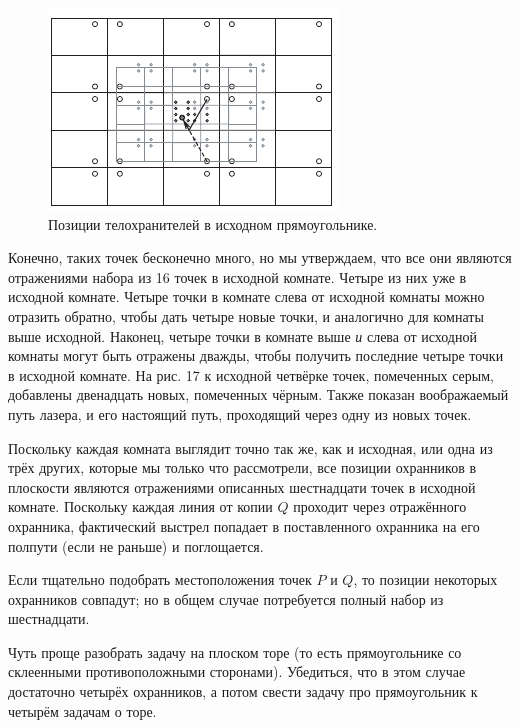 \begin{figure}[b!]
\centering
\includegraphics[scale=1]{pics/room3}
\caption{Позиции телохранителей в исходном прямоугольнике.}
\label{pic:room3}
\end{figure}

Конечно, таких точек бесконечно много, но мы утверждаем, что все они являются отражениями набора из 16 точек в исходной комнате.
Четыре из них уже в исходной комнате.
Четыре точки в комнате слева от исходной комнаты можно отразить обратно, чтобы дать четыре новые точки, и аналогично для комнаты выше исходной.
Наконец, четыре точки в комнате выше \emph{и} слева от исходной комнаты могут быть отражены дважды, чтобы получить последние четыре точки в исходной комнате.
На рис. 17 к исходной четвёрке точек, помеченных серым, добавлены двенадцать новых, помеченных чёрным.
Также показан воображаемый путь лазера, и его настоящий путь, проходящий через одну из новых точек.

Поскольку каждая комната выглядит точно так же, как и исходная, или одна из трёх других, которые мы только что рассмотрели, все позиции охранников в плоскости являются отражениями описанных шестнадцати точек в исходной комнате.
Поскольку каждая линия от копии $Q$ проходит через отражённого охранника, фактический выстрел попадает в поставленного охранника на его полпути (если не раньше) и поглощается.

Если тщательно подобрать местоположения точек $P$ и $Q$, то позиции некоторых охранников совпадут;
но в общем случае потребуется полный набор из шестнадцати.


\begin{addedbytheeditors}
Чуть проще разобрать задачу на плоском торе (то есть прямоугольнике со склеенными противоположными сторонами).
Убедиться, что в этом случае достаточно четырёх охранников, а потом свести задачу про прямоугольник к четырём задачам о торе.
\end{addedbytheeditors}



